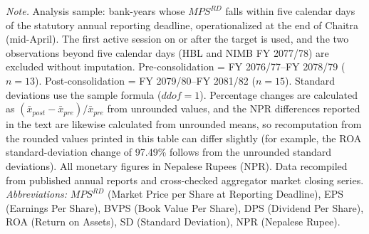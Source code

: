 \vspace{4pt}
{\footnotesize\noindent
\textit{Note.} Analysis sample: bank-years whose $\mathit{MPS}^{RD}$ falls within five calendar days of the statutory annual reporting deadline, operationalized at the end of Chaitra (mid-April). The first active session on or after the target is used, and the two observations beyond five calendar days (HBL and NIMB FY 2077/78) are excluded without imputation. Pre-consolidation = FY 2076/77--FY 2078/79 ($n = 13$). Post-consolidation = FY 2079/80--FY 2081/82 ($n = 15$). Standard deviations use the sample formula ($ddof=1$). Percentage changes are calculated as $(\bar{x}_{post}-\bar{x}_{pre})/\bar{x}_{pre}$ from unrounded values, and the NPR differences reported in the text are likewise calculated from unrounded means, so recomputation from the rounded values printed in this table can differ slightly (for example, the ROA standard-deviation change of 97.49\% follows from the unrounded standard deviations). All monetary figures in Nepalese Rupees (NPR). Data recompiled from published annual reports and cross-checked aggregator market closing series. \\
\textit{Abbreviations:} $\mathit{MPS}^{RD}$ (Market Price per Share at Reporting Deadline), EPS (Earnings Per Share), BVPS (Book Value Per Share), DPS (Dividend Per Share), ROA (Return on Assets), SD (Standard Deviation), NPR (Nepalese Rupee).
\par}

